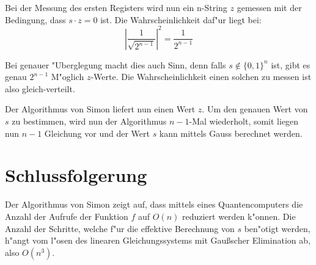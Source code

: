\begin{refsection}
Bei der Messung des ersten Registers wird nun ein n-String $z$ gemessen mit der
Bedingung, dass $s \cdot z = 0$ ist. Die Wahrscheinlichkeit daf"ur liegt bei:
\[
    |\frac1{\sqrt{2^{n - 1}}}|^2 = \frac1{2^{n-1}} 
\]

Bei genauer "Uberglegung macht dies auch Sinn, denn falls $s \notin \{0,1\}^n$
ist, gibt es genau $2^{n-1}$ M"oglich $z$-Werte. Die Wahrscheinlichkeit einen
solchen zu messen ist also gleich-verteilt.

Der Algorithmus von Simon liefert nun einen Wert $z$. Um den genauen Wert von
$s$ zu bestimmen, wird nun der Algorithmus $n-1$-Mal wiederholt, somit liegen
nun $n-1$ Gleichung vor und der Wert $s$ kann mittels Gauss berechnet werden.

\section{Schlussfolgerung}

Der Algorithmus von Simon zeigt auf, dass mittels eines Quantencomputers die
Anzahl der Aufrufe der Funktion $f$ auf $O(n)$ reduziert werden k"onnen. Die
Anzahl der Schritte, welche f"ur die effektive Berechnung von $s$ ben"otigt
werden, h"angt vom l"osen des linearen Gleichungssystems mit Gaußscher
Elimination ab, also $O(n^3)$.


\printbibliography[heading=subbibliography] \end{refsection}



